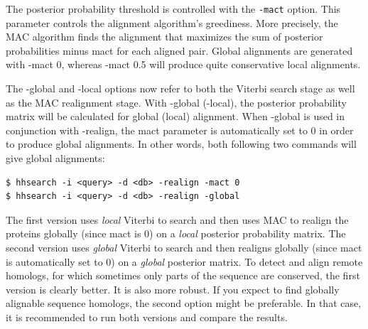 \documentclass[11pt,a4paper]{article}
\begin{document}
The posterior probability threshold is controlled with the \verb`-mact` option. 
This parameter controls the alignment algorithm's greediness. More precisely, the 
MAC algorithm finds the alignment that maximizes the sum of posterior probabilities 
minus mact for each aligned pair. Global alignments are generated with -mact 0, 
whereas -mact 0.5 will produce quite conservative local alignments. 

The -global and -local options now refer to both the Viterbi search stage as 
well as the MAC realignment stage. With -global (-local), the posterior probability 
matrix will be calculated for global (local) alignment. When -global is used in 
conjunction with -realign, the mact parameter is automatically set to 0 in order to 
produce global alignments. In other words, both following two commands will give 
global alignments:
\begin{verbatim}
$ hhsearch -i <query> -d <db> -realign -mact 0
$ hhsearch -i <query> -d <db> -realign -global
\end{verbatim}

The first version uses \emph{local} Viterbi to search and then uses MAC to realign the 
proteins globally (since mact is 0) on a \emph{local} posterior probability matrix. The 
second version uses \emph{global} Viterbi to search and then realigns globally (since mact 
is automatically set to 0) on a \emph{global} posterior matrix. To detect and align remote 
homologs, for which sometimes only parts of the sequence are conserved, the first 
version is clearly better. It is also more robust. If you expect to find globally 
alignable sequence homologs, the second option might be preferable. In that case, 
it is recommended to run both versions and compare the results. 
\end{document}
